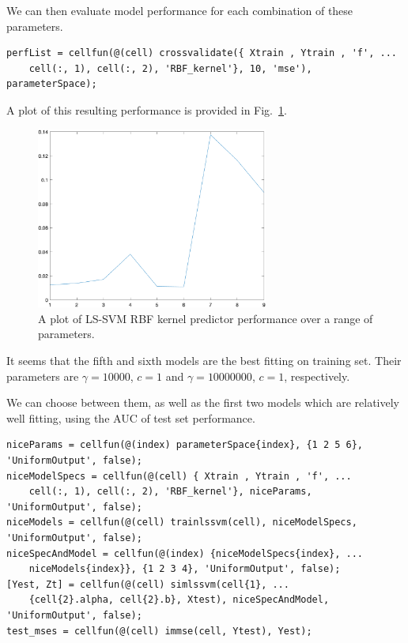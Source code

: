 \documentclass[10pt,a4paper]{article}
\begin{document}
We can then evaluate model performance for each combination of these parameters.

\begin{lstlisting}[style=Matlab-editor, frame=single]
perfList = cellfun(@(cell) crossvalidate({ Xtrain , Ytrain , 'f', ...
    cell(:, 1), cell(:, 2), 'RBF_kernel'}, 10, 'mse'), parameterSpace);
\end{lstlisting}

A plot of this resulting performance is provided in Fig.~\ref{fig:crossvalidatedRBFSinc}.

\begin{figure}[h!]
\centering
  \includegraphics[width=3in]{crossvalidatedRBFSinc.png}
  \caption{A plot of LS-SVM RBF kernel predictor performance over a range of parameters.}
  \label{fig:crossvalidatedRBFSinc}
\end{figure}

It seems that the fifth and sixth models are the best fitting on training set. Their parameters are $\gamma=10000$, $c=1$ and $\gamma=10000000$, $c=1$, respectively.

We can choose between them, as well as the first two models which are relatively well fitting, using the AUC of test set performance.

\begin{lstlisting}[style=Matlab-editor, frame=single]
niceParams = cellfun(@(index) parameterSpace{index}, {1 2 5 6}, 'UniformOutput', false);
niceModelSpecs = cellfun(@(cell) { Xtrain , Ytrain , 'f', ...
    cell(:, 1), cell(:, 2), 'RBF_kernel'}, niceParams, 'UniformOutput', false);
niceModels = cellfun(@(cell) trainlssvm(cell), niceModelSpecs, 'UniformOutput', false);
niceSpecAndModel = cellfun(@(index) {niceModelSpecs{index}, ...
    niceModels{index}}, {1 2 3 4}, 'UniformOutput', false);
[Yest, Zt] = cellfun(@(cell) simlssvm(cell{1}, ...
    {cell{2}.alpha, cell{2}.b}, Xtest), niceSpecAndModel, 'UniformOutput', false);
test_mses = cellfun(@(cell) immse(cell, Ytest), Yest);
\end{lstlisting}
\end{document}
